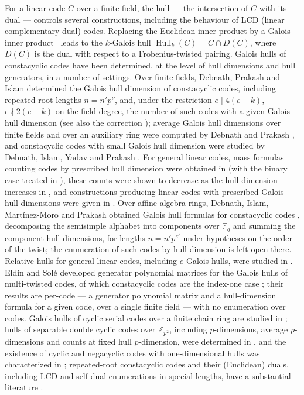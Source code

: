 \documentclass[11pt]{article}
\theoremstyle{definition}
\theoremstyle{remark}
\newcommand{\Fq}{\mathbb{F}_q}
\newcommand{\Hull}{\operatorname{Hull}}
\begin{document}
For a linear code \(C\) over a finite field, the hull --- the intersection
of \(C\) with its dual --- controls several constructions, including
the behaviour of LCD (linear complementary dual) codes. Replacing the
Euclidean inner product by a Galois inner product~\cite{FZ2017} leads to the
\(k\)-Galois hull \(\Hull_k(C) = C \cap D(C)\), where \(D(C)\) is the dual
with respect to a Frobenius-twisted pairing. Galois hulls of constacyclic
codes have been determined, at the level of hull dimensions and hull
generators, in a number of settings. Over finite fields,
Debnath, Prakash and Islam determined the Galois hull dimension of
constacyclic codes, including repeated-root lengths \(n = n' p^{\nu}\),
and, under the restriction \(e \mid 4(e-k)\), \(e \nmid 2(e-k)\) on the
field degree, the number of such codes with a given Galois hull
dimension \cite{DPI2023} (see also the correction \cite{DPI2023corr}); average Galois hull dimensions over finite
fields and over an auxiliary ring were computed by Debnath and Prakash
\cite{DP2025}, and constacyclic codes with small Galois hull dimension
were studied by Debnath, Islam, Yadav and Prakash \cite{DIYP2026}. For general linear codes, mass formulas counting codes by prescribed hull dimension were obtained in \cite{LSL2025} (with the binary case treated in \cite{LS2024}), these counts were shown to decrease as the hull dimension increases in \cite{BBO2026}, and constructions producing linear codes with prescribed Galois hull dimensions were given in \cite{LYW2025}. Over
affine algebra rings, Debnath, Islam, Mart\'inez-Moro and Prakash obtained
Galois hull formulas for constacyclic codes \cite{DIMP2026},
decomposing the semisimple alphabet into components over \(\Fq\) and
summing the component hull dimensions, for lengths \(n = n' p^{e'}\)
under hypotheses on the order of the twist; the enumeration of such
codes by hull dimension is left open there. Relative hulls for general linear codes, including \(e\)-Galois hulls, were studied in \cite{ACLMRS2024}. Eldin and Sol\'e
developed generator polynomial matrices for the Galois hulls of
multi-twisted codes, of which constacyclic codes are the index-one case
\cite{ES2026}; their results are per-code --- a generator polynomial
matrix and a hull-dimension formula for a given code, over a single
finite field --- with no enumeration over codes. Galois hulls of cyclic serial codes over a finite chain ring are studied in
\cite{Talbi2021}; hulls of separable double cyclic codes over \(\mathbb{Z}_{p^2}\), including \(p\)-dimensions, average \(p\)-dimensions and counts at fixed hull \(p\)-dimension, were determined in \cite{DPDC2025}, and the existence of cyclic and negacyclic codes with one-dimensional hulls was characterized in \cite{DS2024}; repeated-root constacyclic codes and their (Euclidean)
duals, including LCD and self-dual enumerations in special lengths, have
a substantial literature \cite{CDL2015, Sharma2015, WZLL2023, ZWLL2025}.
\end{document}
